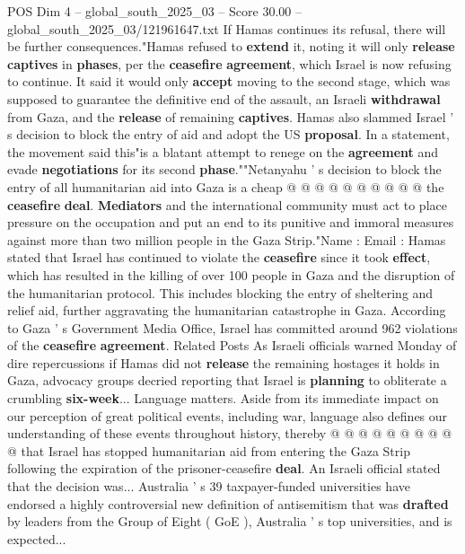\begin{textsample}{POS Dim 4 – global\_south\_2025\_03 – Score 30.00 – global\_south\_2025\_03/121961647.txt}
If Hamas continues its refusal, there will be further consequences."Hamas refused to \textbf{extend} it, noting it will only \textbf{release} \textbf{captives} in \textbf{phases}, per the \textbf{ceasefire} \textbf{agreement}, which Israel is now refusing to continue.
It said it would only \textbf{accept} moving to the second stage, which was supposed to guarantee the definitive end of the assault, an Israeli \textbf{withdrawal} from Gaza, and the \textbf{release} of remaining \textbf{captives}.
Hamas also slammed Israel ' s decision to block the entry of aid and adopt the US \textbf{proposal}.
In a statement, the movement said this"is a blatant attempt to renege on the \textbf{agreement} and evade \textbf{negotiations} for its second \textbf{phase}.""Netanyahu ' s decision to block the entry of all humanitarian aid into Gaza is a cheap @ @ @ @ @ @ @ @ @ @ the \textbf{ceasefire} \textbf{deal}. \textbf{Mediators} and the international community must act to place pressure on the occupation and put an end to its punitive and immoral measures against more than two million people in the Gaza Strip."Name : Email : Hamas stated that Israel has continued to violate the \textbf{ceasefire} since it took \textbf{effect}, which has resulted in the killing of over 100 people in Gaza and the disruption of the humanitarian protocol.
This includes blocking the entry of sheltering and relief aid, further aggravating the humanitarian catastrophe in Gaza.
According to Gaza ' s Government Media Office, Israel has committed around 962 violations of the \textbf{ceasefire} \textbf{agreement}.
Related Posts As Israeli officials warned Monday of dire repercussions if Hamas did not \textbf{release} the remaining hostages it holds in Gaza, advocacy groups decried reporting that Israel is \textbf{planning} to obliterate a crumbling \textbf{six-week}...
Language matters.
Aside from its immediate impact on our perception of great political events, including war, language also defines our understanding of these events throughout history, thereby @ @ @ @ @ @ @ @ @ @ that Israel has stopped humanitarian aid from entering the Gaza Strip following the expiration of the prisoner-ceasefire \textbf{deal}.
An Israeli official stated that the decision was...
Australia ' s 39 taxpayer-funded universities have endorsed a highly controversial new definition of antisemitism that was \textbf{drafted} by leaders from the Group of Eight ( GoE ), Australia ' s top universities, and is expected...

\end{textsample}
